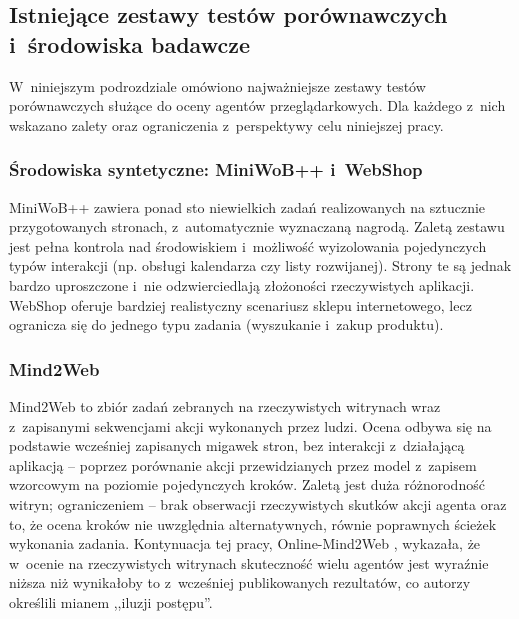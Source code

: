 \subsection{Istniejące zestawy testów porównawczych i~środowiska badawcze}
\label{sec:benchmarki}
W~niniejszym podrozdziale omówiono najważniejsze zestawy testów porównawczych służące do oceny agentów przeglądarkowych. Dla każdego z~nich wskazano zalety oraz ograniczenia z~perspektywy celu niniejszej pracy.

\subsubsection{Środowiska syntetyczne: MiniWoB++ i~WebShop}
MiniWoB++ \citep{liu2018miniwob} zawiera ponad sto niewielkich zadań realizowanych na sztucznie przygotowanych stronach, z~automatycznie wyznaczaną nagrodą. Zaletą zestawu jest pełna kontrola nad środowiskiem i~możliwość wyizolowania pojedynczych typów interakcji (np. obsługi kalendarza czy listy rozwijanej). Strony te są jednak bardzo uproszczone i~nie odzwierciedlają złożoności rzeczywistych aplikacji. WebShop \citep{yao2022webshop} oferuje bardziej realistyczny scenariusz sklepu internetowego, lecz ogranicza się do jednego typu zadania (wyszukanie i~zakup produktu).

\subsubsection{Mind2Web}
Mind2Web \citep{deng2023mind2web} to zbiór zadań zebranych na rzeczywistych witrynach wraz z~zapisanymi sekwencjami akcji wykonanych przez ludzi. Ocena odbywa się na podstawie wcześniej zapisanych migawek stron, bez interakcji z~działającą aplikacją -- poprzez porównanie akcji przewidzianych przez model z~zapisem wzorcowym na poziomie pojedynczych kroków. Zaletą jest duża różnorodność witryn; ograniczeniem -- brak obserwacji rzeczywistych skutków akcji agenta oraz to, że ocena kroków nie uwzględnia alternatywnych, równie poprawnych ścieżek wykonania zadania. Kontynuacja tej pracy, Online-Mind2Web \citep{xue2025illusion}, wykazała, że w~ocenie na rzeczywistych witrynach skuteczność wielu agentów jest wyraźnie niższa niż wynikałoby to z~wcześniej publikowanych rezultatów, co autorzy określili mianem ,,iluzji postępu''.

